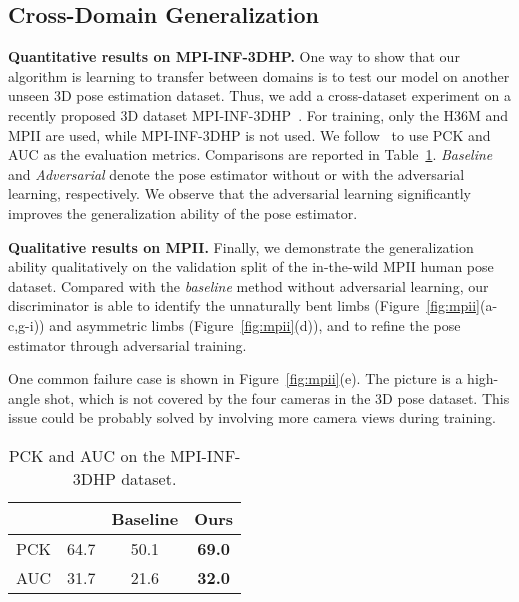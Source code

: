 \documentclass[10pt,twocolumn,letterpaper]{article}
\newcommand{\smalltitle}[1]{\vspace{0.2em}\noindent \textbf{{#1}}}
\begin{document}
\subsection{Cross-Domain Generalization}

\smalltitle{Quantitative results on MPI-INF-3DHP. } 
One way to show that our algorithm is learning to transfer between domains is to test our model on another unseen 3D pose estimation dataset. 
Thus, we add a cross-dataset experiment on a recently proposed 3D dataset MPI-INF-3DHP~\cite{mehta2017monocular}. 
For training, only the H36M and MPII are used, while MPI-INF-3DHP is not used. 
We follow~\cite{mehta2017monocular} to use PCK and AUC as the evaluation metrics. 
Comparisons are reported in Table~\ref{tab:mpi-inf-3dhp}. 
\textit{Baseline} and \textit{Adversarial} denote the pose estimator without or with the adversarial learning, respectively. 
We observe that the adversarial learning significantly improves the generalization ability of the pose estimator. 

\smalltitle{Qualitative results on MPII. } 
Finally, we demonstrate the generalization ability qualitatively on the validation split of the in-the-wild MPII human pose~\cite{andriluka20142d} dataset. 
Compared with the \textit{baseline} method without adversarial learning, our discriminator is able to identify the unnaturally bent limbs (Figure~\ref{fig:mpii}(a-c,g-i)) and asymmetric limbs (Figure~\ref{fig:mpii}(d)), and to refine the pose estimator through adversarial training. 

One common failure case is shown in Figure~\ref{fig:mpii}(e). 
The picture is a high-angle shot, which is not covered by the four cameras in the 3D pose dataset. 
This issue could be probably solved by involving more camera views during training. 




\begin{table}\centering
    \begin{footnotesize}
	\begin{tabular} {l | c  c  c}
		\hline
		 & \cite{mehta2017monocular} & Baseline & Ours \\
		\hline
		 PCK & 64.7 & 50.1 & \textbf{69.0} \\ 
		 AUC & 31.7 & 21.6 & \textbf{32.0} \\
		\hline
	\end{tabular}
	\caption{PCK and AUC on the MPI-INF-3DHP dataset. 
}
	\vspace{-2em}
	\label{tab:mpi-inf-3dhp}
    \end{footnotesize}
\end{table}
\end{document}

